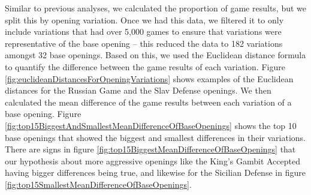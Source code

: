 \documentclass[a4paper, 11pt]{article}
\begin{document}
Similar to previous analyses, we calculated the proportion of game results, but we split this by opening variation. Once we had this data, we filtered it to only include variations that had over 5,000 games to ensure that variations were representative of the base opening -- this reduced the data to 182 variations amongst 32 base openings. Based on this, we used the Euclidean distance formula to quantify the difference between the game results of each variation. Figure \ref{fig:euclideanDistancesForOpeningVariations} shows examples of the Euclidean distances for the Russian Game and the Slav Defense openings. We then calculated the mean difference of the game results between each variation of a base opening. Figure \ref{fig:top15BiggestAndSmallestMeanDifferenceOfBaseOpenings} shows the top 10 base openings that showed the biggest and smallest differences in their variations. There are signs in figure \ref{fig:top15BiggestMeanDifferenceOfBaseOpenings} that our hypothesis about more aggressive openings like the King's Gambit Accepted having bigger differences being true, and likewise for the Sicilian Defense in figure \ref{fig:top15SmallestMeanDifferenceOfBaseOpenings}.
\end{document}
